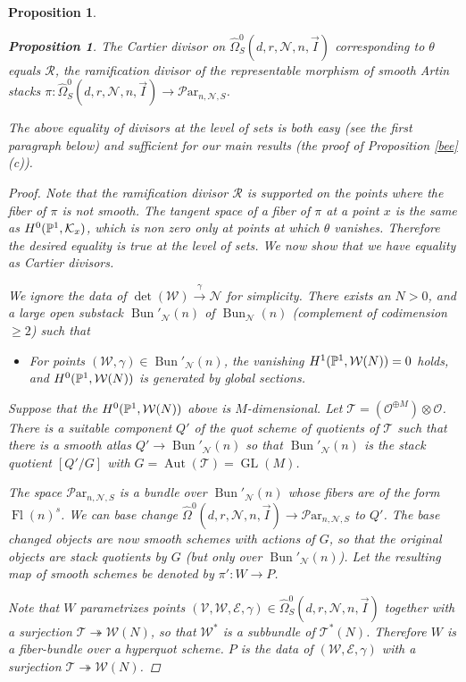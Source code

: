 \documentclass[11pt]{amsart}
\newcommand\op{\operatorname}
\newcommand\me{\mathcal{E}}
\newcommand\mt{\mathcal{T}}
\newcommand\Fl{\operatorname{Fl}}
\newcommand\mv{\mathcal{V}}
\newcommand\tensor{\otimes}
\newcommand\mw{\mathcal{W}}
\newcommand\mn{\mathcal{N}}
\newcommand\Par{\mathcal{P}\text{ar} }
\newcommand{\leto}[1]{\stackrel{#1}{\to}}
\newtheorem{proposition}[theorem]{Proposition}
\numberwithin{theorem}{subsection}
\begin{document}
{\begin{proposition}
\begin{proposition}
The Cartier divisor on $\widehat{\Omega}^0_S(d,r,\mn,n,\vec{I})$  corresponding to $\theta$ equals $\mathcal{R}$, the ramification divisor of the representable morphism of smooth Artin stacks $\pi:\widehat{\Omega}^0_S(d,r,\mn,n,\vec{I})\to \Par_{n,\mn,S}$.
\end{proposition}
The above equality of divisors at the level of sets is both easy (see the first paragraph below) and sufficient for our main results (the proof of Proposition \ref{bee}(c)). 
 \begin{proof}
 Note that the ramification divisor $\mathcal{R}$ is supported on the points where the fiber of $\pi$ is not smooth. The tangent space of a fiber of $\pi$ at a point $x$ is the same as $H^0(\Bbb{P}^1,\mathcal{K}_x)$, which is non zero only at points at which $\theta$ vanishes. Therefore the desired equality is true at the level of sets. We now show that we have equality as Cartier divisors.

 We ignore the data of $\det(\mw)\leto{\gamma}\mathcal{N}$ for simplicity. There exists an $N>0$, and a large open substack $\op{Bun}'_{\mn}(n)$ of $\op{Bun}_{\mn}(n)$ (complement of codimension $\geq 2$) such that
\begin{itemize}
\item[-] For points $(\mw,\gamma)\in \op{Bun}'_{\mn}(n)$, the vanishing $H^1(\Bbb{P}^1,\mw(N))=0$ holds, and $H^0(\Bbb{P}^1,\mw(N))$ is generated by global sections.
\end{itemize}
 Suppose that the $H^0(\Bbb{P}^1,\mw(N))$  above is $M$-dimensional. Let $\mt=(\mathcal{O}^{\oplus M})\tensor \mathcal{O}$. There is a suitable component $Q'$ of the quot scheme of quotients of $\mt$ such that there is a smooth atlas $Q'\to \op{Bun}'_{\mn}(n)$ so that $\op{Bun}'_{\mn}(n)$ is the stack quotient
$[Q'/G]$ with $G= \operatorname{Aut}(\mt)=\operatorname{GL}(M)$.

The space $\Par_{n,\mn,S}$ is a bundle over $\op{Bun}'_{\mn}(n)$ whose fibers are of the form $\Fl(n)^s$. We can base change  $\widehat{\Omega}^0(d,r,\mn,n,\vec{I})\to \Par_{n,\mn,S}$ to $Q'$. The base changed objects are now smooth schemes with actions of $G$, so that the original objects are stack quotients by $G$ (but only over $\op{Bun}'_{\mn}(n)$). Let the resulting map of smooth schemes be denoted by $\pi':W\to P$.

Note that $W$ parametrizes points $(\mv,\mw,\me,\gamma)\in \widehat{\Omega}^0_S(d,r,\mn,n,\vec{I})$ together with a surjection $\mt\twoheadrightarrow  \mw(N)$, so that $\mw^*$ is a subbundle of $\mt^*(N)$. Therefore $W$ is a fiber-bundle over a hyperquot scheme. $P$ is the data of $(\mw,\me,\gamma)$  with a surjection $\mt\twoheadrightarrow \mw(N)$.



\end{proof}
\end{proposition}}
\end{document}
